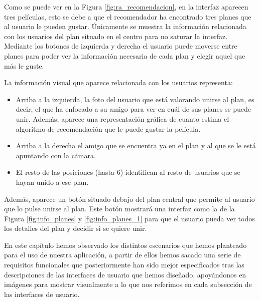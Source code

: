 Como se puede ver en la Figura \ref{fig:ra_recomendacion}, en la interfaz aparecen tres películas, esto se debe a que el recomendador ha encontrado tres planes que al usuario le pueden gustar. Únicamente se muestra la 
información relacionada con los usuarios del plan situado en el centro para no saturar la interfaz. Mediante los 
botones de izquierda y derecha el usuario puede moverse entre planes para poder ver la información necesaria 
de cada plan y elegir aquel que más le guste.


La información visual que aparece relacionada con los usuarios representa:
\begin{itemize}
    \item Arriba a la izquierda, la foto del usuario que está valorando unirse al plan, es decir, el que ha enfocado a su amigo para ver en cuál de sus planes se puede unir. Además, aparece una representación 
    gráfica de cuanto estima el algoritmo de recomendación que le puede gustar la película.
    \item Arriba a la derecha el amigo que se encuentra ya en el plan y al que se le está apuntando con la cámara.
    \item El resto de las posiciones (hasta 6) identifican al resto de usuarios que se hayan unido a ese plan.
\end{itemize}
Además, aparece un botón situado debajo del plan central que permite al usuario que lo pulse unirse al 
plan. Este botón mostrará una interfaz como la de la Figura \ref{fig:info_planes} y \ref{fig:info_planes_1} para que el usuario pueda ver todos 
los detalles del plan y decidir si se quiere unir.



En este capítulo hemos observado los distintos escenarios que hemos planteado para el uso de nuestra aplicación, a partir de ellos hemos sacado una serie de 
 requisitos funcionales que posteriormente han sido mejor especificados tras las descripciones de las interfaces de usuario que hemos diseñado, apoyándonos en imágenes 
 para mostrar visualmente a lo que nos referimos en cada subsección de las interfaces de usuario.





